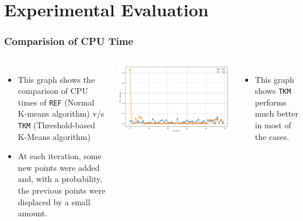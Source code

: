 \documentclass{beamer}
\begin{document}
\section{Experimental Evaluation}
\begin{frame}
\frametitle{Comparision of CPU Time}

\begin{columns}

\begin{itemize}
  \item This graph shows the comparison of CPU times of \texttt{REF} (Normal K-means algorithm) v/s \texttt{TKM} (Threshold-based K-Means algorithm)
  \item At each iteration, some new points were added and, with a probability, the previous points were displaced by a small amount.
  

\end{itemize}

\includegraphics[width=1\textwidth]{Diff.png}
\begin{itemize} 
  \vspace{-0.2cm}
\item \small This graph shows \texttt{TKM} performs much better in most of the cases.
\end{itemize}
\end{columns}
\end{frame}
\end{document}
